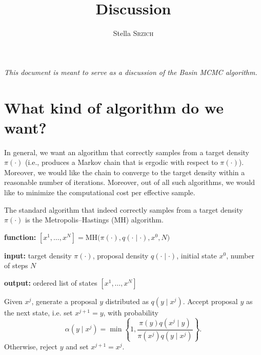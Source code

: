 \documentclass[12pt]{article}
\title{Discussion}
\author{Stella \textsc{Srzich}}
\theoremstyle{definition}
\theoremstyle{remark}
\theoremstyle{plain}
\begin{document}
\maketitle


\textit{This document is meant to serve as a discussion of the Basin MCMC algorithm.}


\section{What kind of algorithm do we want?}
In general, we want an algorithm that 
correctly samples from a target density $\pi(\cdot)$ 
(i.e., produces a Markov chain that is ergodic with respect to $\pi(\cdot)$). 
Moreover, we would like the chain to converge to the target density within a reasonable number of iterations. 
Moreover, out of all such algorithms, we would like to minimize the computational cost per effective sample.

The standard algorithm that indeed correctly samples 
from a target density $\pi(\cdot)$ is the Metropolis--Hastings (MH) algorithm.

\begin{algorithm}[H]
  \caption{Metropolis--Hastings (MH)}
  \label{alg:mh}

  \textbf{function:} $[x^1,\ldots,x^N] =
  \mathrm{MH}\bigl(\pi(\cdot), q(\cdot\mid\cdot), x^0, N\bigr)$

  \textbf{input:} target density $\pi(\cdot)$, proposal density
  $q(\cdot\mid\cdot)$, initial state $x^0$, number of steps $N$

  \textbf{output:} ordered list of states $[x^1,\ldots,x^N]$

  \begin{algorithmic}[1]
      \State Given $x^j$, generate a proposal $y$ distributed as $q(y \mid x^j)$.
      \State Accept proposal $y$ as the next state, i.e. set $x^{j+1} = y$, with probability
      \[
          \alpha(y \mid x^j)
          =
          \min\left\{
              1,
              \frac{\pi(y)q(x^j\mid y)}
                   {\pi(x^j)q(y\mid x^j)}
          \right\}.
      \]
      \State Otherwise, reject $y$ and set $x^{j+1} = x^j$.
  \EndFor
  \end{algorithmic}
\end{algorithm}
\end{document}
